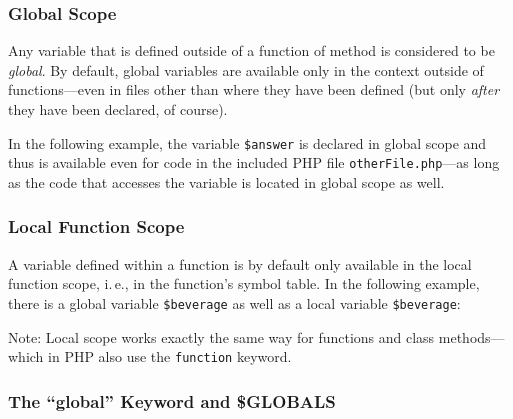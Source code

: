 \subsubsection{Global Scope}

Any variable that is defined outside of a function of method is considered to be \emph{global}. By default, global variables are available only in the context outside of functions---even in files other than where they have been defined (but only \emph{after} they have been declared, of course).

In the following example, the variable \texttt{\$answer} is declared in global scope and thus is available even for code in the included PHP file \texttt{otherFile.php}---as long as the code that accesses the variable is located in global scope as well.



\subsubsection{Local Function Scope}

A variable defined within a function is by default only available in the local function scope, i.\,e., in the function's symbol table. In the following example, there is a global variable \texttt{\$beverage} as well as a local variable \texttt{\$beverage}:


Note: Local scope works exactly the same way for functions and class methods---which in PHP also use the \texttt{function} keyword.


\subsubsection{The ``global'' Keyword and \$GLOBALS}
\label{sec:globals}

